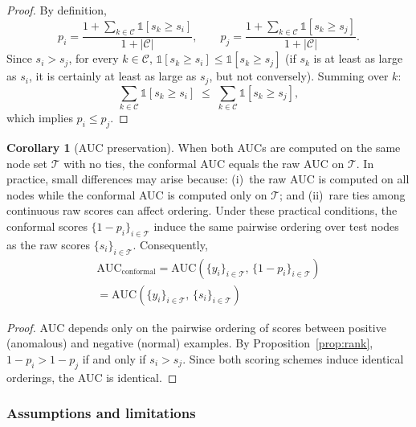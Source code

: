 \documentclass[a4paper]{cas-dc}
\theoremstyle{definition}
\newtheorem{corollary}{Corollary}
\begin{document}
\begin{proof}
By definition,
\begin{equation}
    p_i = \frac{1 + \sum_{k \in \mathcal{C}}\mathbb{1}[s_k \geq s_i]}{1 + |\mathcal{C}|}, \qquad
    p_j = \frac{1 + \sum_{k \in \mathcal{C}}\mathbb{1}[s_k \geq s_j]}{1 + |\mathcal{C}|}.
\end{equation}
Since $s_i > s_j$, for every $k \in \mathcal{C}$, $\mathbb{1}[s_k \geq s_i] \leq \mathbb{1}[s_k \geq s_j]$ (if $s_k$ is at least as large as $s_i$, it is certainly at least as large as $s_j$, but not conversely).  Summing over $k$:
\begin{equation}
    \sum_{k \in \mathcal{C}}\mathbb{1}[s_k \geq s_i] \;\leq\; \sum_{k \in \mathcal{C}}\mathbb{1}[s_k \geq s_j],
\end{equation}
which implies $p_i \leq p_j$.
\end{proof}

\begin{corollary}[AUC preservation]
\label{cor:auc}
When both AUCs are computed on the same node set $\mathcal{T}$ with no ties, the conformal AUC equals the raw AUC on $\mathcal{T}$.  In practice, small differences may arise because: (i)~the raw AUC is computed on all nodes while the conformal AUC is computed only on $\mathcal{T}$; and (ii)~rare ties among continuous raw scores can affect ordering.  Under these practical conditions, the conformal scores $\{1 - p_i\}_{i \in \mathcal{T}}$ induce the same pairwise ordering over test nodes as the raw scores $\{s_i\}_{i \in \mathcal{T}}$.  Consequently,
\begin{multline}
    \mathrm{AUC}_{\mathrm{conformal}} = \mathrm{AUC}\!\left(\{y_i\}_{i \in \mathcal{T}},\, \{1 - p_i\}_{i \in \mathcal{T}}\right) \\
    = \mathrm{AUC}\!\left(\{y_i\}_{i \in \mathcal{T}},\, \{s_i\}_{i \in \mathcal{T}}\right)
\end{multline}
\end{corollary}

\begin{proof}
AUC depends only on the pairwise ordering of scores between positive (anomalous) and negative (normal) examples.  By Proposition~\ref{prop:rank}, $1 - p_i > 1 - p_j$ if and only if $s_i > s_j$.  Since both scoring schemes induce identical orderings, the AUC is identical.
\end{proof}

\subsubsection{Assumptions and limitations}
\label{sec:th_limitations}
\end{document}
